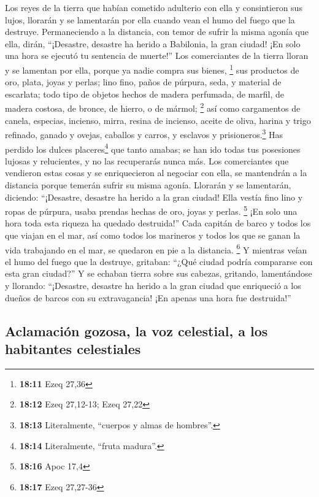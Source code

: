  Los reyes de la tierra que habían cometido adulterio con
ella y consintieron sus lujos, llorarán y se lamentarán por ella cuando
vean el humo del fuego que la destruye.  Permaneciendo a
la distancia, con temor de sufrir la misma agonía que ella, dirán,
``¡Desastre, desastre ha herido a Babilonia, la gran ciudad! ¡En solo
una hora se ejecutó tu sentencia de muerte!''  Los
comerciantes de la tierra lloran y se lamentan por ella, porque ya nadie
compra sus bienes, \footnote{\textbf{18:11} Ezeq 27,36} 
sus productos de oro, plata, joyas y perlas; lino fino, paños de
púrpura, seda, y material de escarlata; todo tipo de objetos hechos de
madera perfumada, de marfil, de madera costosa, de bronce, de hierro, o
de mármol; \footnote{\textbf{18:12} Ezeq 27,12-13; Ezeq 27,22}
 así como cargamentos de canela, especias, incienso,
mirra, resina de incienso, aceite de oliva, harina y trigo refinado,
ganado y ovejas, caballos y carros, y esclavos y prisioneros.\footnote{\textbf{18:13}
  Literalmente, ``cuerpos y almas de hombres''.}  Has
perdido los dulces placeres\footnote{\textbf{18:14} Literalmente,
  ``fruta madura''.} que tanto amabas; se han ido todas tus posesiones
lujosas y relucientes, y no las recuperarás nunca más. 
Los comerciantes que vendieron estas cosas y se enriquecieron al
negociar con ella, se mantendrán a la distancia porque temerán sufrir su
misma agonía. Llorarán y se lamentarán, diciendo: 
``¡Desastre, desastre ha herido a la gran ciudad! Ella vestía fino lino
y ropas de púrpura, usaba prendas hechas de oro, joyas y perlas.
\footnote{\textbf{18:16} Apoc 17,4}  ¡En solo una hora
toda esta riqueza ha quedado destruida!'' Cada capitán de barco y todos
los que viajan en el mar, así como todos los marineros y todos los que
se ganan la vida trabajando en el mar, se quedaron en pie a la
distancia. \footnote{\textbf{18:17} Ezeq 27,27-36}  Y
mientras veían el humo del fuego que la destruye, gritaban: ``¿Qué
ciudad podría compararse con esta gran ciudad?''  Y se
echaban tierra sobre sus cabezas, gritando, lamentándose y llorando:
``¡Desastre, desastre ha herido a la gran ciudad que enriqueció a los
dueños de barcos con su extravagancia! ¡En apenas una hora fue
destruida!''

\hypertarget{aclamaciuxf3n-gozosa-la-voz-celestial-a-los-habitantes-celestiales}{%
\subsection{Aclamación gozosa, la voz celestial, a los habitantes
celestiales}\label{aclamaciuxf3n-gozosa-la-voz-celestial-a-los-habitantes-celestiales}}

